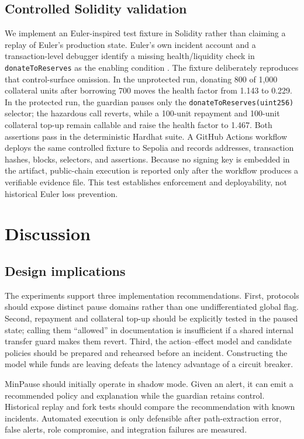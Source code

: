 \documentclass[sn-vancouver,Numbered]{sn-jnl}
\begin{document}
\subsection{Controlled Solidity validation}
We implement an Euler-inspired test fixture in Solidity rather than claiming a replay of Euler's production state. Euler's own incident account and a transaction-level debugger identify a missing health/liquidity check in \texttt{donateToReserves} as the enabling condition \cite{euler2024war,blocksec2026debugger}. The fixture deliberately reproduces that control-surface omission. In the unprotected run, donating 800 of 1,000 collateral units after borrowing 700 moves the health factor from 1.143 to 0.229. In the protected run, the guardian pauses only the \texttt{donateToReserves(uint256)} selector; the hazardous call reverts, while a 100-unit repayment and 100-unit collateral top-up remain callable and raise the health factor to 1.467. Both assertions pass in the deterministic Hardhat suite. A GitHub Actions workflow deploys the same controlled fixture to Sepolia and records addresses, transaction hashes, blocks, selectors, and assertions. Because no signing key is embedded in the artifact, public-chain execution is reported only after the workflow produces a verifiable evidence file. This test establishes enforcement and deployability, not historical Euler loss prevention.

\section{Discussion}
\subsection{Design implications}
The experiments support three implementation recommendations.  First, protocols should expose distinct pause domains rather than one undifferentiated global flag.  Second, repayment and collateral top-up should be explicitly tested in the paused state; calling them ``allowed'' in documentation is insufficient if a shared internal transfer guard makes them revert.  Third, the action--effect model and candidate policies should be prepared and rehearsed before an incident.  Constructing the model while funds are leaving defeats the latency advantage of a circuit breaker.

MinPause should initially operate in shadow mode.  Given an alert, it can emit a recommended policy and explanation while the guardian retains control.  Historical replay and fork tests should compare the recommendation with known incidents.  Automated execution is only defensible after path-extraction error, false alerts, role compromise, and integration failures are measured.
\end{document}
